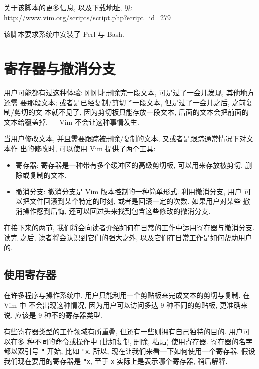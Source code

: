 关于该脚本的更多信息, 以及下载地址, 见:
\url{http://www.vim.org/scripts/script.php?script_id=279}

\begin{warning}
    该脚本要求系统中安装了 Perl 与 Bash.
\end{warning}

\section{寄存器与撤消分支}
\label{sec:registers_and_undo_branching}

用户可能都有过这种体验: 刚刚才删除完一段文本, 可是过了一会儿发现, 其他地方还需
要那段文本; 或者是已经复制/剪切了一段文本, 但是过了一会儿之后, 之前复制/剪切的文
本就不见了, 因为剪切板只能存放一段文本, 后面的文本会把前面的文本给覆盖掉. ---
Vim 不会让这种事情发生.

当用户修改文本, 并且需要跟踪被删除/复制的文本, 又或者是跟踪通常情况下对文本作
出的修改时, 可以使用 Vim 提供了两个工具:
\begin{itemize}
    \item 寄存器: 寄存器是一种带有多个缓冲区的高级剪切板, 可以用来存放被剪切,
        删除或复制的文本.
    \item 撤消分支: 撤消分支是 Vim 版本控制的一种简单形式. 利用撤消分支, 用户 
        可以把文件回滚到某个特定的时刻, 或者是回滚一定的次数. 如果用户对某些
        撤消操作感到后悔, 还可以回过头来找到包含这些修改的撤消分支.
\end{itemize}

在接下来的两节, 我们将会向读者介绍如何在日常的工作中运用寄存器与撤消分支. 读完
之后, 读者将会认识到它们的强大之外, 以及它们在日常工作是如何帮助用户的.

\subsection{使用寄存器}
\label{subsec:using_registers}

在许多程序与操作系统中, 用户只能利用一个剪贴板来完成文本的剪切与复制. 在 Vim 中
不会出现这种情况, 因为用户可以访问多达 9 种不同的剪贴板, 更准确来说, 应该是 9
种不的寄存器类型.

有些寄存器类型的工作领域有所重叠, 但还有一些则拥有自己独特的目的. 用户可以在多
种不同的命令或操作中 (比如复制, 删除, 粘贴) 使用寄存器. 寄存器的名字都以双引号
\texttt{"} 开始, 比如 \texttt{"x}, 所以, 现在让我们来看一下如何使用一个寄存器.
假设我们现在要用的寄存器是 \texttt{"x}, 至于 \texttt{x} 实际上是表示哪个寄存器,
稍后解释.

